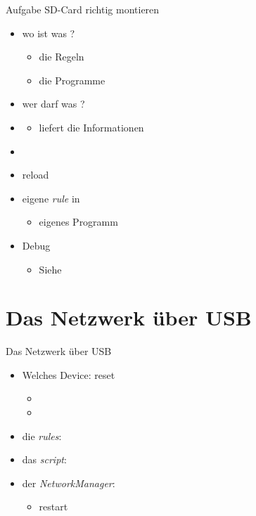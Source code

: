 \documentclass{beamer}
\begin{document}
\begin{frame}{Aufgabe }{SD-Card richtig montieren}
 \begin{itemize}
  \item wo ist was ?
   \begin{itemize}
    \item die Regeln
    \item die Programme
   \end{itemize}
   \item wer darf was ?
  \item {}
  \begin{itemize}
   \item liefert die Informationen
  \end{itemize}
  \item {}
  \item {} reload
  \item eigene {\em rule}  in 
  \begin{itemize}
   \item {} eigenes Programm
  \end{itemize}
  \item Debug
  \begin{itemize}
   \item Siehe 
  \end{itemize}
 \end{itemize}
\end{frame}

\section{Das Netzwerk über USB}
\begin{frame}{Das Netzwerk über USB}
 \begin{itemize}
  \item Welches Device: \targetS reset
  \begin{itemize}
   \item {}
   \item {}
  \end{itemize}
  \item die {\em rules}: 
  \item das {\em script}: 
  \item der {\em NetworkManager}: 
  \begin{itemize}
   \item restart 
  \end{itemize}
 \end{itemize}
\end{frame}
\end{document}
